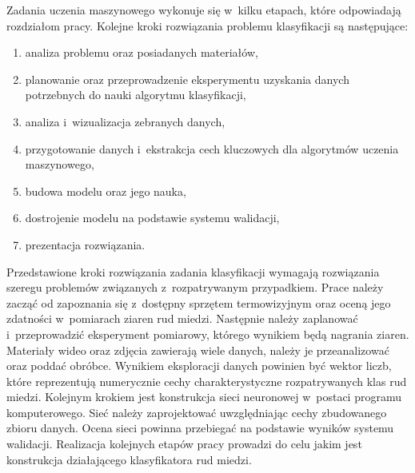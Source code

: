 Zadania uczenia maszynowego wykonuje się w~kilku etapach, które odpowiadają
rozdziałom pracy.
Kolejne kroki rozwiązania problemu klasyfikacji są następujące:
\begin{enumerate}
    \item analiza problemu oraz posiadanych materiałów,
    \item planowanie oraz przeprowadzenie eksperymentu uzyskania danych
          potrzebnych do nauki algorytmu klasyfikacji,
    \item analiza i~wizualizacja zebranych danych,
    \item przygotowanie danych i~ekstrakcja cech kluczowych dla
          algorytmów uczenia maszynowego,
    \item budowa modelu oraz jego nauka,
    \item dostrojenie modelu na podstawie systemu walidacji,
    \item prezentacja rozwiązania.
\end{enumerate}
Przedstawione kroki rozwiązania zadania klasyfikacji wymagają rozwiązania
szeregu problemów związanych z~rozpatrywanym przypadkiem.
Prace należy zacząć od zapoznania się z~dostępny sprzętem termowizyjnym oraz 
oceną jego zdatności w~pomiarach ziaren rud miedzi.
Następnie należy zaplanować i~przeprowadzić eksperyment pomiarowy, którego
wynikiem będą nagrania ziaren.
Materiały wideo oraz zdjęcia zawierają wiele danych, należy je przeanalizować
oraz poddać obróbce.
Wynikiem eksploracji danych powinien być wektor liczb,
które reprezentują numerycznie cechy charakterystyczne rozpatrywanych klas
rud miedzi.
Kolejnym krokiem jest konstrukcja sieci neuronowej w~postaci programu
komputerowego.
Sieć należy zaprojektować uwzględniając cechy zbudowanego zbioru danych.
Ocena sieci powinna przebiegać na podstawie wyników systemu walidacji.
Realizacja kolejnych etapów pracy prowadzi do celu jakim jest konstrukcja
działającego klasyfikatora rud miedzi.

